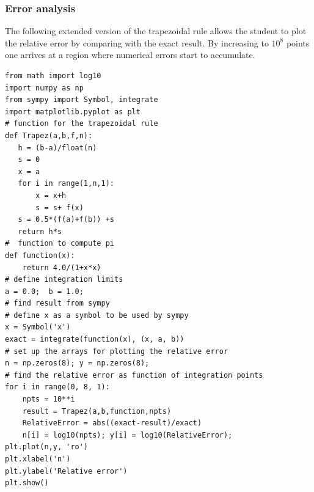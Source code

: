 \documentclass{beamer}
\begin{document}
\begin{frame}
\frametitle{Error analysis}

\begin{block}{}
The following extended version of the trapezoidal rule allows the student to plot the relative error by comparing with the exact result. By increasing to $10^8$ points one arrives at a region where numerical errors start to accumulate.
\begin{verbatim}
from math import log10
import numpy as np
from sympy import Symbol, integrate
import matplotlib.pyplot as plt
# function for the trapezoidal rule
def Trapez(a,b,f,n):
   h = (b-a)/float(n)
   s = 0
   x = a
   for i in range(1,n,1):
       x = x+h
       s = s+ f(x)
   s = 0.5*(f(a)+f(b)) +s
   return h*s
#  function to compute pi
def function(x):
    return 4.0/(1+x*x)
# define integration limits
a = 0.0;  b = 1.0;
# find result from sympy
# define x as a symbol to be used by sympy
x = Symbol('x')
exact = integrate(function(x), (x, a, b))
# set up the arrays for plotting the relative error
n = np.zeros(8); y = np.zeros(8);
# find the relative error as function of integration points
for i in range(0, 8, 1):
    npts = 10**i
    result = Trapez(a,b,function,npts)
    RelativeError = abs((exact-result)/exact)
    n[i] = log10(npts); y[i] = log10(RelativeError);   
plt.plot(n,y, 'ro')
plt.xlabel('n')
plt.ylabel('Relative error')
plt.show()
\end{verbatim}
\end{block}
\end{frame}
\end{document}
